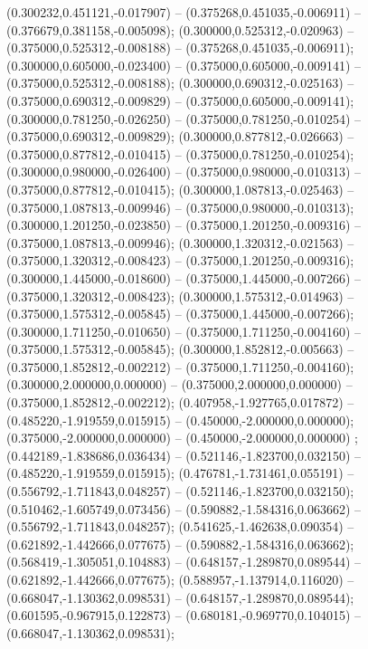  (0.300232,0.451121,-0.017907) -- (0.375268,0.451035,-0.006911) -- (0.376679,0.381158,-0.005098);
 (0.300000,0.525312,-0.020963) -- (0.375000,0.525312,-0.008188) -- (0.375268,0.451035,-0.006911);
 (0.300000,0.605000,-0.023400) -- (0.375000,0.605000,-0.009141) -- (0.375000,0.525312,-0.008188);
 (0.300000,0.690312,-0.025163) -- (0.375000,0.690312,-0.009829) -- (0.375000,0.605000,-0.009141);
 (0.300000,0.781250,-0.026250) -- (0.375000,0.781250,-0.010254) -- (0.375000,0.690312,-0.009829);
 (0.300000,0.877812,-0.026663) -- (0.375000,0.877812,-0.010415) -- (0.375000,0.781250,-0.010254);
 (0.300000,0.980000,-0.026400) -- (0.375000,0.980000,-0.010313) -- (0.375000,0.877812,-0.010415);
 (0.300000,1.087813,-0.025463) -- (0.375000,1.087813,-0.009946) -- (0.375000,0.980000,-0.010313);
 (0.300000,1.201250,-0.023850) -- (0.375000,1.201250,-0.009316) -- (0.375000,1.087813,-0.009946);
 (0.300000,1.320312,-0.021563) -- (0.375000,1.320312,-0.008423) -- (0.375000,1.201250,-0.009316);
 (0.300000,1.445000,-0.018600) -- (0.375000,1.445000,-0.007266) -- (0.375000,1.320312,-0.008423);
 (0.300000,1.575312,-0.014963) -- (0.375000,1.575312,-0.005845) -- (0.375000,1.445000,-0.007266);
 (0.300000,1.711250,-0.010650) -- (0.375000,1.711250,-0.004160) -- (0.375000,1.575312,-0.005845);
 (0.300000,1.852812,-0.005663) -- (0.375000,1.852812,-0.002212) -- (0.375000,1.711250,-0.004160);
 (0.300000,2.000000,0.000000) -- (0.375000,2.000000,0.000000) -- (0.375000,1.852812,-0.002212);
 (0.407958,-1.927765,0.017872) -- (0.485220,-1.919559,0.015915) -- (0.450000,-2.000000,0.000000);
 (0.375000,-2.000000,0.000000) -- (0.450000,-2.000000,0.000000) ;
 (0.442189,-1.838686,0.036434) -- (0.521146,-1.823700,0.032150) -- (0.485220,-1.919559,0.015915);
 (0.476781,-1.731461,0.055191) -- (0.556792,-1.711843,0.048257) -- (0.521146,-1.823700,0.032150);
 (0.510462,-1.605749,0.073456) -- (0.590882,-1.584316,0.063662) -- (0.556792,-1.711843,0.048257);
 (0.541625,-1.462638,0.090354) -- (0.621892,-1.442666,0.077675) -- (0.590882,-1.584316,0.063662);
 (0.568419,-1.305051,0.104883) -- (0.648157,-1.289870,0.089544) -- (0.621892,-1.442666,0.077675);
 (0.588957,-1.137914,0.116020) -- (0.668047,-1.130362,0.098531) -- (0.648157,-1.289870,0.089544);
 (0.601595,-0.967915,0.122873) -- (0.680181,-0.969770,0.104015) -- (0.668047,-1.130362,0.098531);
